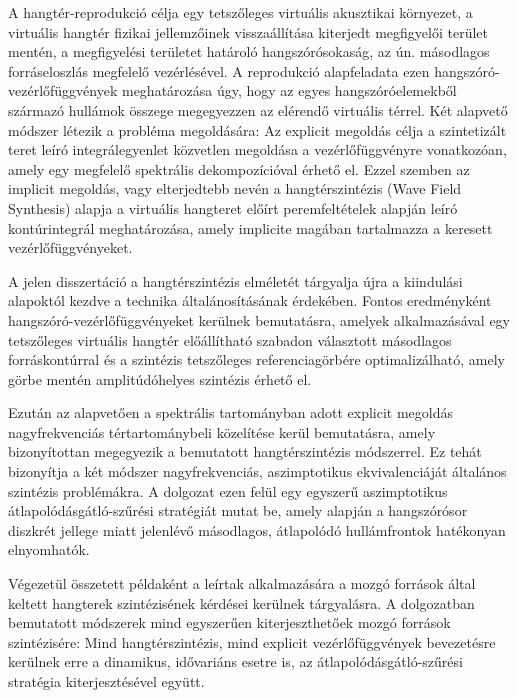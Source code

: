 A hangtér-reprodukció célja egy tetszőleges virtuális akusztikai környezet, a virtuális hangtér fizikai jellemzőinek visszaállítása kiterjedt megfigyelői terület mentén, a megfigyelési területet határoló hangszórósokaság, az ún. másodlagos forráseloszlás megfelelő vezérlésével. 
A reprodukció alapfeladata ezen hangszóró-vezérlőfüggvények meghatározása úgy, hogy az egyes hangszóróelemekből származó hullámok összege megegyezzen az elérendő virtuális térrel.
Két alapvető módszer létezik a probléma megoldására:
Az explicit megoldás célja a szintetizált teret leíró integrálegyenlet közvetlen megoldása a vezérlőfüggvényre vonatkozóan, amely egy megfelelő spektrális dekompozícióval érhető el.
Ezzel szemben az implicit megoldás, vagy elterjedtebb nevén a hangtérszintézis (Wave Field Synthesis) alapja a virtuális hangteret előírt peremfeltételek alapján leíró kontúrintegrál meghatározása, amely implicite magában tartalmazza a keresett vezérlőfüggvényeket.

A jelen disszertáció a hangtérszintézis elméletét tárgyalja újra a kiindulási alapoktól kezdve a technika általánosításának érdekében.
Fontos eredményként hangszóró-vezérlőfüggvényeket kerülnek bemutatásra, amelyek alkalmazásával egy tetszőleges virtuális hangtér előállítható szabadon választott másodlagos forráskontúrral és a szintézis tetszőleges referenciagörbére optimalizálható, amely görbe mentén amplitúdóhelyes szintézis érhető el.

Ezután az alapvetően a spektrális tartományban adott explicit megoldás nagyfrekvenciás tértartománybeli közelítése kerül bemutatásra, amely bizonyítottan megegyezik a bemutatott hangtérszintézis módszerrel. 
Ez tehát bizonyítja a két módszer nagyfrekvenciás, aszimptotikus ekvivalenciáját általános szintézis problémákra.
A dolgozat ezen felül egy egyszerű aszimptotikus átlapolódásgátló-szűrési stratégiát mutat be, amely alapján a hangszórósor diszkrét jellege miatt jelenlévő másodlagos, átlapolódó hullámfrontok hatékonyan elnyomhatók.

Végezetül összetett példaként a leírtak alkalmazására a mozgó források által keltett hangterek szintézisének kérdései kerülnek tárgyalásra.
A dolgozatban bemutatott módszerek mind egyszerűen kiterjeszthetőek mozgó források szintézisére:
Mind hangtérszintézis, mind explicit vezérlőfüggvények bevezetésre kerülnek erre a dinamikus, idővariáns esetre is, az átlapolódásgátló-szűrési stratégia kiterjesztésével együtt.